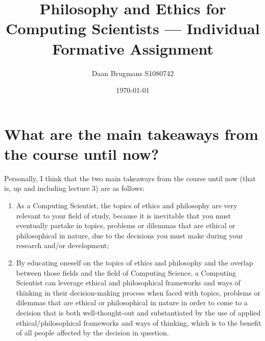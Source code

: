 \documentclass{IEEEtran}
\title{Philosophy and Ethics for Computing Scientists --- Individual Formative Assignment}
\author{Daan Brugmans S1080742}
\date{\today}
\begin{document}
\maketitle

\section*{What are the main takeaways from the course until now?}
Personally, I think that the two main takeaways from the course until now (that is, up and including lecture 3) are as follows:
\begin{enumerate}
    \item As a Computing Scientist, the topics of ethics and philosophy are very relevant to your field of study, because it is inevitable that you must eventually partake in topics, problems or dilemmas that are ethical or philosophical in nature, due to the decisions you must make during your research and/or development;
    \item By educating oneself on the topics of ethics and philosophy and the overlap between those fields and the field of Computing Science, a Computing Scientist can leverage ethical and philosophical frameworks and ways of thinking in their decision-making process when faced with topics, problems or dilemmas that are ethical or philosophical in nature in order to come to a decision that is both well-thought-out and substantiated by the use of applied ethical/philosophical frameworks and ways of thinking, which is to the benefit of all people affected by the decision in question.
\end{enumerate}

\end{document}
